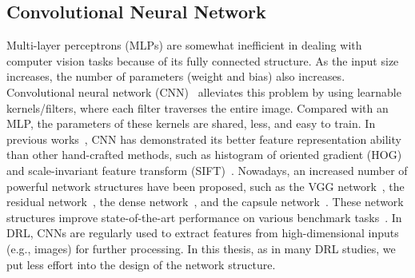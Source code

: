 \subsection{Convolutional Neural Network}
Multi-layer perceptrons (MLPs) are somewhat inefficient in dealing with computer vision tasks because of its fully connected structure. As the input size increases, the number of parameters (weight and bias) also increases. Convolutional neural network (CNN)~\cite{lecun1998gradient} alleviates this problem by using learnable kernels/filters, where each filter traverses the entire image.  Compared with an MLP, the parameters of these kernels are shared, less, and easy to train. In previous works~\cite{krizhevsky2012imagenet,girshick2014rich,detone2016deep}, CNN has demonstrated its better feature representation ability than other hand-crafted methods, such as histogram of oriented gradient (HOG)~\cite{dalal2005histograms} and scale-invariant feature transform (SIFT)~\cite{lowe2004distinctive}. Nowadays, an increased number of powerful network structures have been proposed, such as the VGG network~\cite{simonyan2014very}, the residual network~\cite{he2016deep}, the dense network~\cite{huang2017densely}, and the capsule network~\cite{sabour2017dynamic}. These network structures improve state-of-the-art performance on various benchmark tasks~\cite{deng2009imagenet,everingham2010pascal}. In DRL, CNNs are regularly used to extract features from high-dimensional inputs (e.g., images) for further processing. In this thesis, as in many DRL studies, we put less effort into the design of the network structure.

